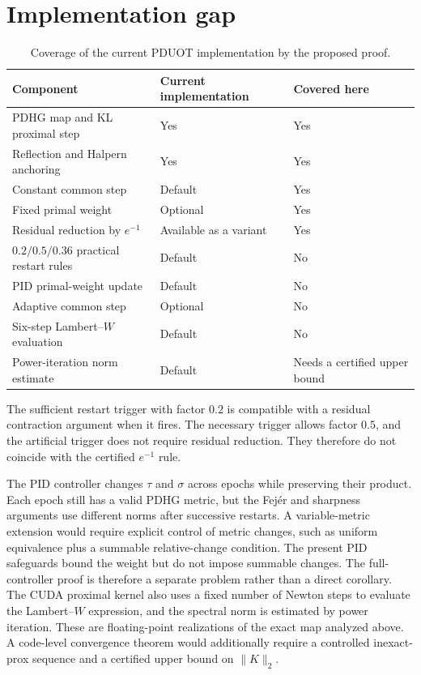 \documentclass[11pt]{article}
\begin{document}
\section{Implementation gap}\label{sec:implementation-gap}

\begin{table}[ht]
\centering
\caption{Coverage of the current PDUOT implementation by the proposed proof.}
\begin{tabular}{lll}
\toprule
Component & Current implementation & Covered here \\
\midrule
PDHG map and KL proximal step & Yes & Yes \\
Reflection and Halpern anchoring & Yes & Yes \\
Constant common step & Default & Yes \\
Fixed primal weight & Optional & Yes \\
Residual reduction by $e^{-1}$ & Available as a variant & Yes \\
$0.2/0.5/0.36$ practical restart rules & Default & No \\
PID primal-weight update & Default & No \\
Adaptive common step & Optional & No \\
Six-step Lambert--$W$ evaluation & Default & No \\
Power-iteration norm estimate & Default & Needs a certified upper bound \\
\bottomrule
\end{tabular}
\end{table}

The sufficient restart trigger with factor $0.2$ is compatible with a residual contraction argument when it fires.
The necessary trigger allows factor $0.5$, and the artificial trigger does not require residual reduction.
They therefore do not coincide with the certified $e^{-1}$ rule.

The PID controller changes $\tau$ and $\sigma$ across epochs while preserving their product.
Each epoch still has a valid PDHG metric, but the Fej\'er and sharpness arguments use different norms after successive restarts.
A variable-metric extension would require explicit control of metric changes, such as uniform equivalence plus a summable relative-change condition.
The present PID safeguards bound the weight but do not impose summable changes.
The full-controller proof is therefore a separate problem rather than a direct corollary.
The CUDA proximal kernel also uses a fixed number of Newton steps to evaluate the Lambert--$W$ expression, and the spectral norm is estimated by power iteration.
These are floating-point realizations of the exact map analyzed above.
A code-level convergence theorem would additionally require a controlled inexact-prox sequence and a certified upper bound on $\lVert K\rVert_2$.
\end{document}
